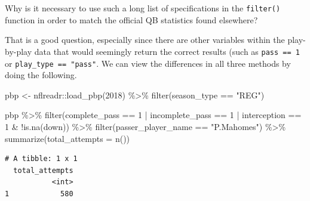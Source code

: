 \documentclass[
  letterpaper,
]{krantz}
\newenvironment{Shaded}{\begin{snugshade}}{\end{snugshade}}
\newcommand{\AttributeTok}[1]{\textcolor[rgb]{0.40,0.45,0.13}{#1}}
\newcommand{\DecValTok}[1]{\textcolor[rgb]{0.68,0.00,0.00}{#1}}
\newcommand{\FunctionTok}[1]{\textcolor[rgb]{0.28,0.35,0.67}{#1}}
\newcommand{\NormalTok}[1]{\textcolor[rgb]{0.00,0.23,0.31}{#1}}
\newcommand{\OtherTok}[1]{\textcolor[rgb]{0.00,0.23,0.31}{#1}}
\newcommand{\SpecialCharTok}[1]{\textcolor[rgb]{0.37,0.37,0.37}{#1}}
\newcommand{\StringTok}[1]{\textcolor[rgb]{0.13,0.47,0.30}{#1}}
\begin{document}
\begin{tcolorbox}[enhanced jigsaw, left=2mm, toprule=.15mm, opacitybacktitle=0.6, leftrule=.75mm, bottomrule=.15mm, colbacktitle=quarto-callout-tip-color!10!white, breakable, colback=white, bottomtitle=1mm, toptitle=1mm, title=\textcolor{quarto-callout-tip-color}{\faLightbulb}\hspace{0.5em}{Tip}, coltitle=black, titlerule=0mm, arc=.35mm, opacityback=0, colframe=quarto-callout-tip-color-frame, rightrule=.15mm]

Why is it necessary to use such a long list of specifications in the
\texttt{filter()} function in order to match the official QB statistics
found elsewhere?

That is a good question, especially since there are other variables
within the play-by-play data that would seemingly return the correct
results (such as \texttt{pass\ ==\ 1} or
\texttt{play\_type\ ==\ "pass"}. We can view the differences in all
three methods by doing the following.

\begin{Shaded}
\begin{Highlighting}[]
\NormalTok{pbp }\OtherTok{\textless{}{-}}\NormalTok{ nflreadr}\SpecialCharTok{::}\FunctionTok{load\_pbp}\NormalTok{(}\DecValTok{2018}\NormalTok{) }\SpecialCharTok{\%\textgreater{}\%}
  \FunctionTok{filter}\NormalTok{(season\_type }\SpecialCharTok{==} \StringTok{"REG"}\NormalTok{)}

\NormalTok{pbp }\SpecialCharTok{\%\textgreater{}\%}
  \FunctionTok{filter}\NormalTok{(complete\_pass }\SpecialCharTok{==} \DecValTok{1} \SpecialCharTok{|}\NormalTok{ incomplete\_pass }\SpecialCharTok{==} \DecValTok{1} \SpecialCharTok{|}
\NormalTok{           interception }\SpecialCharTok{==} \DecValTok{1} \SpecialCharTok{\&}
           \SpecialCharTok{!}\FunctionTok{is.na}\NormalTok{(down)) }\SpecialCharTok{\%\textgreater{}\%}
  \FunctionTok{filter}\NormalTok{(passer\_player\_name }\SpecialCharTok{==} \StringTok{"P.Mahomes"}\NormalTok{) }\SpecialCharTok{\%\textgreater{}\%}
  \FunctionTok{summarize}\NormalTok{(}\AttributeTok{total\_attempts =} \FunctionTok{n}\NormalTok{())}
\end{Highlighting}
\end{Shaded}

\begin{verbatim}
# A tibble: 1 x 1
  total_attempts
           <int>
1            580
\end{verbatim}


\end{tcolorbox}
\end{document}
